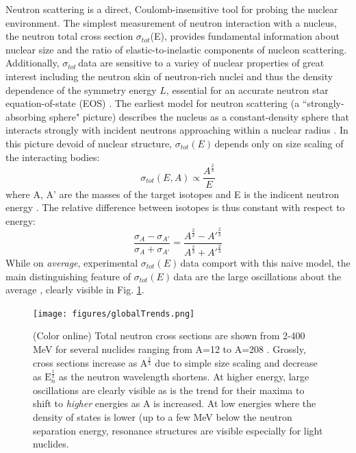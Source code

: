 \documentclass[twocolumn,secnumarabic,amssymb, nobibnotes, aps, prl,
superscriptaddress, nobalancelastpage]{revtex4}
\newcommand{\tots}{\ensuremath{\sigma_{tot}}\,}
\newcommand{\totE}{\ensuremath{\sigma_{tot}}(E)}
\newcommand{\totEs}{\ensuremath{\sigma_{tot}(E)\,}}
\begin{document}
Neutron scattering is a direct, Coulomb-insensitive tool for probing the nuclear
environment. The simplest measurement of neutron interaction with a nucleus,
the neutron total cross section \totE, provides fundamental information about
nuclear size and the ratio of elastic-to-inelastic components of nucleon 
scattering. Additionally, \tots data are sensitive to a variey of nuclear
properties of great interest including the neutron skin of neutron-rich nuclei
\cite{Mahzoon2017} and thus the density dependence of the symmetry energy $L$,
essential for an accurate neutron star equation-of-state (EOS)
\cite{Fattoyev2012, Vinas2014, Brown2000}.
The earliest model for neutron scattering (a ``strongly-absorbing sphere"
picture) describes the nucleus as a constant-density sphere that interacts
strongly with incident neutrons approaching within a nuclear radius
\cite{Feshbach1949}. In this picture devoid of nuclear structure, \totEs depends
only on size scaling of the interacting bodies:
\begin{equation} \label{eq1}
    \sigma_{tot}(E,A) \propto \frac{A^{\frac{2}{3}}}{E}
\end{equation}
where A, A' are the masses of the target isotopes and E is the indicent neutron
energy \cite{Fernbach1949, Satchler1980}. 
The relative difference between isotopes is thus constant with respect to energy:
\begin{equation}
    \frac{\sigma_{A}-\sigma_{A'}}{\sigma_{A}+\sigma_{A'}} =
    \frac{A^{\frac{2}{3}}-A'^{\frac{2}{3}}}{A^{\frac{2}{3}}+A'^{\frac{2}{3}}}
\end{equation}
While on \textit{average}, experimental \totEs data comport with this naive
model, the main distinguishing feature of \totEs data are the large
oscillations about the average \cite{Satchler1980, McVoy1967}, clearly
visible in Fig. \ref{GlobalTrends}.

\begin{figure}
    \texttt{[image: figures/globalTrends.png]}
    \caption{(Color online) Total neutron cross sections are shown from 2-400
        MeV for several nuclides ranging from A=12 to A=208 \cite{Finlay1993,
    Schwartz1974, Poenitz1983, Abfalterer2000, Abfalterer2001}. Grossly, cross
    sections increase as A$^{\frac{2}{3}}$ due to simple size scaling and decrease as
$\text{E}_{n}^{\frac{1}{2}}$ as the neutron wavelength shortens. At higher
energy, large oscillations are clearly visible as is the trend for their maxima
to shift to \textit{higher} energies as A is increased. At low energies where
the density of states is lower (up to a few MeV below the neutron separation
energy, resonance structures are visible especially for light nuclides.}
    \label{GlobalTrends}
\end{figure}
\end{document}
